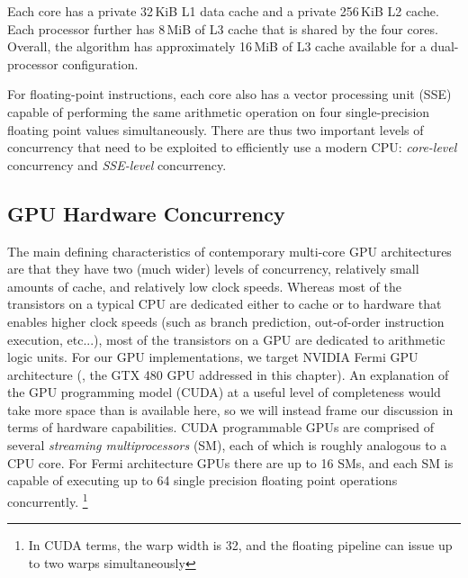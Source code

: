 Each core has a private 32\,KiB L1 data cache and a private 256\,KiB L2 cache.
Each processor further has 8\,MiB of L3 cache that is shared by the four cores.
Overall, the algorithm has approximately 16\,MiB of L3 cache
available for a dual-processor configuration.  

For floating-point instructions, each core also has a vector processing unit
(SSE) capable of performing the same arithmetic operation on four single-precision 
floating point values simultaneously.
There are thus two important levels of concurrency that need to be exploited to
efficiently use a modern CPU: {\em core-level} concurrency and {\em SSE-level}
concurrency. 

\subsection{GPU Hardware Concurrency} 
The main defining characteristics of contemporary multi-core GPU architectures
are that they have two (much wider) levels of concurrency, relatively small amounts of
 cache, and relatively low clock speeds.  Whereas most of the transistors on
a typical CPU are dedicated either to cache or to hardware that enables higher
clock speeds (such as branch prediction, out-of-order instruction execution, etc...),
most of the transistors on a GPU are dedicated to arithmetic logic units.
For our GPU implementations, we target NVIDIA Fermi GPU architecture (\eg, the GTX 480
GPU addressed in this chapter).  An explanation of the GPU programming model (CUDA) at a useful level of completeness would take more space than is available here, so we will instead frame our discussion in terms of 
hardware capabilities. 
CUDA programmable GPUs are comprised of several
\emph{streaming multiprocessors} (SM), each of which is roughly analogous to a CPU core.
For Fermi architecture GPUs there are up to 16 SMs, and each SM is capable of executing up to 64 single precision 
floating point operations
concurrently. \footnote{In CUDA terms, the warp width is 32, and the floating pipeline can
issue up to two warps simultaneously}

